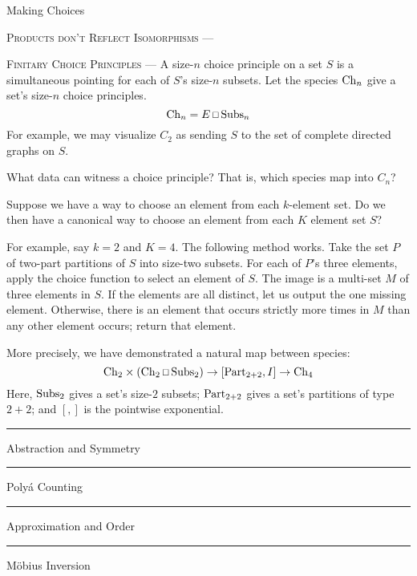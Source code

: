 \documentclass[12pt, justified]{tufte-book}
\newcommand{\smallsquare}{\,\text{\scriptsize$\square$}\,}
\theoremstyle{definition}
\newcommand{\msec}[1]{
  \begin{center}\parbox{\textwidth}{\begin{center}
    \hrule\vspace{0.25cm}
    \Large\sc#1\vspace{0.25cm}
    \hrule
  \end{center}}\end{center}
}
\newcommand{\mssec}[1]{
  \begin{center}\parbox{8cm}{\begin{center}
    \large\sc#1
  \end{center}}\end{center}
      \vspace{-0.5cm}
}
\newcommand{\mpar}[1]{\vspace{0.5cm}\par\noindent\textsc{#1} --- }
\begin{document}
        

    \mssec{Making Choices}
      \mpar{Products don't Reflect Isomorphisms}
      \mpar{Finitary Choice Principles}
        A size-$n$ choice principle on a set $S$ is a simultaneous pointing for
        each of $S$'s size-$n$ subsets.  Let the species ${\rm Ch}_n$ give a set's
        size-$n$ choice principles.
        $$
            {\rm Ch}_n = E \smallsquare {\rm Subs}_n
        $$
        For example, we may visualize $C_2$ as
        sending $S$ to the set of complete directed graphs on $S$.

        What data can witness a choice principle?  That is, which species map
        into $C_n$?

        Suppose we have a way to choose an element from each $k$-element
        set.  Do we then have a canonical way to choose an element from each
        $K$ element set $S$?  

        For example, say $k=2$ and $K=4$.  The following method works. 
        Take the set $P$ of two-part partitions of $S$ into size-two subsets.
        For each of $P$'s three elements, apply the choice function to select
        an element of $S$.  The image is a multi-set $M$ of three elements in
        $S$.  If the elements are all distinct, let us output the one missing
        element.  Otherwise, there is an element that occurs strictly more
        times in $M$ than any other element occurs; return that element.

        More precisely, we have demonstrated a natural map between
        species:
        $$
            {\rm Ch}_2 \times ({\rm Ch}_2 \smallsquare {\rm Subs}_2) \to [{\rm Part}_{2+2},I] \to {\rm Ch}_4
        $$
        Here, ${\rm Subs}_2$ gives a set's size-$2$ subsets; ${\rm Part}_{2+2}$
        gives a set's partitions of type $2+2$; and $[,]$ is the pointwise
        exponential.

  \msec{Abstraction and Symmetry}
    \mssec{}
    \mssec{Poly\'a Counting}
    \mssec{}

  \msec{Approximation and Order}
    \mssec{}
    \mssec{M\"obius Inversion}
    \mssec{}

\end{document}
